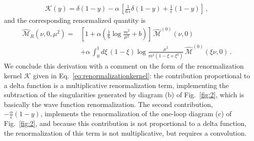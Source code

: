 \begin{align}
        \label{eq:renormalizationkernel}
        \mathcal{K}\left(y\right) = 
        \delta\left(1-y\right) - 
        \alpha\, \left[ \frac{1}{6\,\epsilon}\delta\left(1-y\right) 
        + \frac{1}{\epsilon}\left(1-y\right)\right]\, ,
\end{align}
and the corresponding renormalized quantity is
\begin{align}
        \label{eq::Ioffe1loopren}
        \widehat{\mathcal{M}}_R\left(\nu,0,\mu^2\right) 
        =& \left[1 + 
        \alpha \left(\frac{1}{6}\log\frac{m^2}{\mu^2} + b\right)\right]\, 
        \widehat{\mathcal{M}}^{(0)}\left(\nu, 0\right) \nonumber\\ 
        & + \alpha\,  \int_0^1 d\xi\,\left(1-\xi\right)
        \log\frac{\mu^2}{m^2\left(1-\xi+\xi^2\right)}\, 
        \widehat{\mathcal{M}}^{(0)}\left(\xi\nu, 0\right)\, .  
\end{align}
%
We conclude this derivation with a comment on the form of the renormalization
kernel $\mathcal{K}$ given in Eq.~\eqref{eq:renormalizationkernel}: the
contribution proportional to a delta function is a multiplicative
renormalization term, implementing the subtraction of the singularities
generated by diagram (b) of Fig.~\ref{fig:2}, which is basically the wave
function renormalization. The second contribution,
$-\frac{\alpha}{\epsilon}\left(1-y\right)$, implements the renormalization of
the one-loop diagram (c) of Fig.~\ref{fig:2}, and because this contribution is
not proportional to a delta function, the renormalization of this term is not
multiplicative, but requires a convolution.

